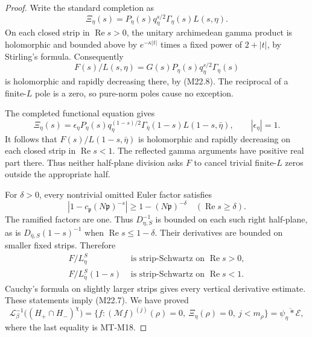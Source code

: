 \documentclass[11pt,a4paper]{article}
\begin{document}
\begin{proof}
Write the standard completion as
\[
 \Xi_\eta(s)=P_\eta(s)q_\eta^{s/2}
                  \Gamma_\eta(s)L(s,\eta).
\]
On each closed strip in \(\operatorname{Re}s>0\),
the unitary archimedean gamma product is
holomorphic and bounded above by
\(e^{-\kappa|t|}\) times a fixed power
of \(2+|t|\), by Stirling's formula.
Consequently
\[
        F(s)/L(s,\eta)
          =G(s)P_\eta(s)q_\eta^{s/2}\Gamma_\eta(s)
\]
is holomorphic and rapidly decreasing there,
by (M22.8).  The reciprocal of a finite-\(L\)
pole is a zero, so pure-norm poles cause
no exception.

The completed functional equation gives
\[
 \Xi_\eta(s)
   =\epsilon_\eta P_\eta(s)q_\eta^{(1-s)/2}
            \Gamma_{\bar\eta}(1-s)L(1-s,\bar\eta),
                    \qquad|\epsilon_\eta|=1.
\]
It follows that \(F(s)/L(1-s,\bar\eta)\)
is holomorphic and rapidly decreasing
on each closed strip in
\(\operatorname{Re}s<1\).
The reflected gamma arguments have positive
real part there.  Thus neither half-plane
division asks \(F\) to cancel trivial
finite-\(L\) zeros outside the appropriate half.

For \(\delta>0\), every nontrivial omitted
Euler factor satisfies
\[
 |1-c_{\mathfrak p}(N\mathfrak p)^{-s}|
                         \ge1-(N\mathfrak p)^{-\delta}
       \quad(\operatorname{Re}s\ge\delta).
\]
The ramified factors are one.
Thus \(D_{\eta,S}^{-1}\) is bounded on each
such right half-plane, as is
\(D_{\bar\eta,S}(1-s)^{-1}\) when
\(\operatorname{Re}s\le1-\delta\).
Their derivatives are bounded on smaller
fixed strips.  Therefore
\[
 \begin{split}
 F/L_\eta^S&\text{ is strip-Schwartz on }\operatorname{Re}s>0,\\
 F/L_{\bar\eta}^S(1-s)&\text{ is strip-Schwartz on }
                                      \operatorname{Re}s<1.
 \end{split}                                                    \tag{M22.9}
\]
Cauchy's formula on slightly larger strips
gives every vertical derivative estimate.
These statements imply (M22.7).
We have proved
\[
 \mathcal L_\beta^{-1}\bigl((H_+\cap H_-)^\chi\bigr)
   =\{f:(\mathcal Mf)^{(j)}(\rho)=0,\
          \Xi_\eta(\rho)=0,\ j<m_\rho\}
   =\overline{\psi_\eta*\mathcal E},                             \tag{M22.10}
\]
where the last equality is MT-M18.


\end{proof}
\end{document}
